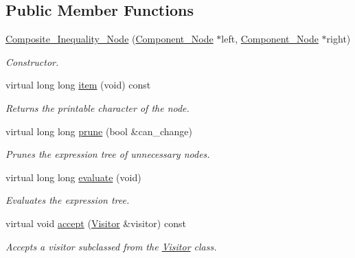 \subsection*{Public Member Functions}
\begin{DoxyCompactItemize}
\item 
\hyperlink{classMadara_1_1Expression__Tree_1_1Composite__Inequality__Node_a1d6f11bdff61c183d68fa96d90eab636}{Composite\_\-Inequality\_\-Node} (\hyperlink{classMadara_1_1Expression__Tree_1_1Component__Node}{Component\_\-Node} $\ast$left, \hyperlink{classMadara_1_1Expression__Tree_1_1Component__Node}{Component\_\-Node} $\ast$right)
\begin{DoxyCompactList}\small\item\em Constructor. \item\end{DoxyCompactList}\item 
virtual long long \hyperlink{classMadara_1_1Expression__Tree_1_1Composite__Inequality__Node_a43913cd3629b7e0ffb818322c193aa29}{item} (void) const 
\begin{DoxyCompactList}\small\item\em Returns the printable character of the node. \item\end{DoxyCompactList}\item 
virtual long long \hyperlink{classMadara_1_1Expression__Tree_1_1Composite__Inequality__Node_a69b643ade2a33e1c67bb0061898c5eab}{prune} (bool \&can\_\-change)
\begin{DoxyCompactList}\small\item\em Prunes the expression tree of unnecessary nodes. \item\end{DoxyCompactList}\item 
virtual long long \hyperlink{classMadara_1_1Expression__Tree_1_1Composite__Inequality__Node_ad3c4a154f6a7e75fbe6be04af875d07e}{evaluate} (void)
\begin{DoxyCompactList}\small\item\em Evaluates the expression tree. \item\end{DoxyCompactList}\item 
virtual void \hyperlink{classMadara_1_1Expression__Tree_1_1Composite__Inequality__Node_a667aea651666d9a0887745b8c5c88cff}{accept} (\hyperlink{classMadara_1_1Expression__Tree_1_1Visitor}{Visitor} \&visitor) const 
\begin{DoxyCompactList}\small\item\em Accepts a visitor subclassed from the \hyperlink{classMadara_1_1Expression__Tree_1_1Visitor}{Visitor} class. \item\end{DoxyCompactList}\item 

\end{DoxyCompactItemize}
